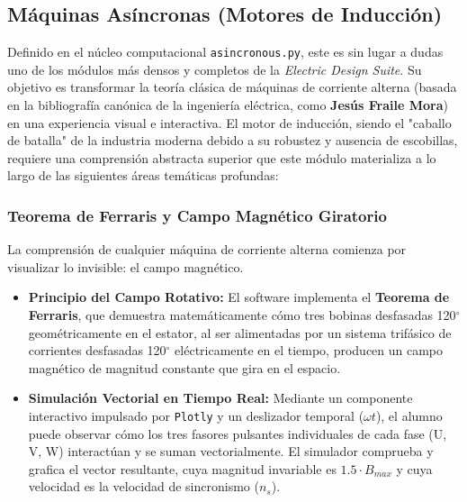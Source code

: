 \documentclass[11pt,a4paper]{article}
\begin{document}
\subsection{Máquinas Asíncronas (Motores de Inducción)}
Definido en el núcleo computacional \texttt{asincronous.py}, este es sin lugar a dudas uno de los módulos más densos y completos de la \textit{Electric Design Suite}. Su objetivo es transformar la teoría clásica de máquinas de corriente alterna (basada en la bibliografía canónica de la ingeniería eléctrica, como \textbf{Jesús Fraile Mora}) en una experiencia visual e interactiva. El motor de inducción, siendo el "caballo de batalla" de la industria moderna debido a su robustez y ausencia de escobillas, requiere una comprensión abstracta superior que este módulo materializa a lo largo de las siguientes áreas temáticas profundas:

\subsubsection{Teorema de Ferraris y Campo Magnético Giratorio}
La comprensión de cualquier máquina de corriente alterna comienza por visualizar lo invisible: el campo magnético.
\begin{itemize}
    \item \textbf{Principio del Campo Rotativo:} El software implementa el \textbf{Teorema de Ferraris}, que demuestra matemáticamente cómo tres bobinas desfasadas 120$^\circ$ geométricamente en el estator, al ser alimentadas por un sistema trifásico de corrientes desfasadas 120$^\circ$ eléctricamente en el tiempo, producen un campo magnético de magnitud constante que gira en el espacio.
    \item \textbf{Simulación Vectorial en Tiempo Real:} Mediante un componente interactivo impulsado por \texttt{Plotly} y un deslizador temporal ($\omega t$), el alumno puede observar cómo los tres fasores pulsantes individuales de cada fase (U, V, W) interactúan y se suman vectorialmente. El simulador comprueba y grafica el vector resultante, cuya magnitud invariable es $1.5 \cdot B_{max}$ y cuya velocidad es la velocidad de sincronismo ($n_s$).
\end{itemize}
\end{document}
